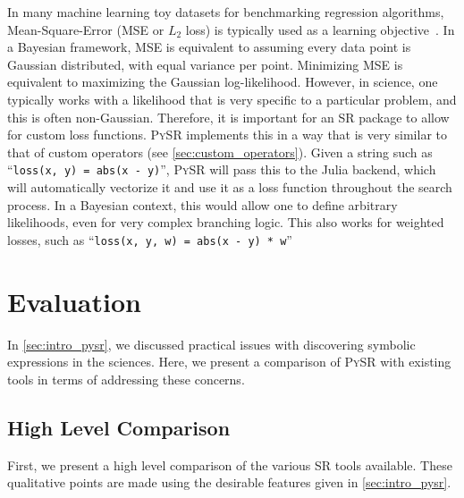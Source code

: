 \documentclass[letterpaper,twocolumn]{scrartcl}
\newcommand\pysr{\textsc{PySR}\xspace}
\begin{document}
In many machine learning toy datasets for benchmarking regression algorithms, Mean-Square-Error (MSE or $L_2$ loss) is typically used as a learning objective~\cite{grinsztajnWhyTreebasedModels2022}.
In a Bayesian framework, MSE is equivalent to assuming every data point is Gaussian distributed, with equal variance per point.
Minimizing MSE is equivalent to maximizing the Gaussian log-likelihood.
However, in science, one typically works with 
a likelihood that is very specific to a particular problem,
and this is often non-Gaussian.
Therefore, it is important for an SR package to allow for custom loss functions.
\pysr implements this in a way that is very similar to that of custom operators (see \cref{sec:custom_operators}).
Given a string such as ``\texttt{loss(x, y) = abs(x - y)}'', \pysr will pass this to the Julia backend, which will automatically vectorize it and use it as a loss function throughout the search process.
In a Bayesian context, this would allow one to define arbitrary likelihoods, even for very complex branching logic.
This also works for weighted losses, such as ``\texttt{loss(x, y, w) = abs(x - y) * w}''


\section{Evaluation}
\label{sec:evaluation}



In \cref{sec:intro_pysr}, we discussed practical issues with discovering symbolic expressions in the sciences.
Here, we present a comparison of \pysr with existing tools in terms of addressing these concerns.


\subsection{High Level Comparison}

First, we present a high level comparison of the various SR tools available.
These qualitative points are made using the desirable features given in \cref{sec:intro_pysr}.


\newcommand\extranotes{
& Expressivity scores: (1a) Inflexible basis of fixed expressions, combined in a linear sum.
(1b) Pre-trained on equations generated from limited prior.
(2) Flexible basis of expressions, with variable internal coefficients.
(3) Any scalar tree, with binary and unary operators.
(4) Any scalar tree, with custom operators allowed.
(5) Any scalar tree, with n-ary operators.
(6) Scalar/vector/tensor expressions of any arity.
\\
$\ast$ & Note that the ``Symbolic Distillation'' method from~\cite{cranmerDiscoveringSymbolicModels2020} is not an algorithm itself; it can be applied to any SR technique. Applying this general method to a specific technique will inherit a {\color{green}$\checkmark$} from the Symbolic Distillation column, if given. However, in general, this technique is easiest with those methods which have deep learning export.\\
}
\end{document}

